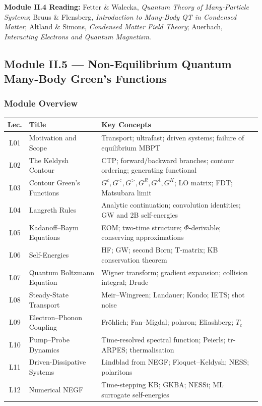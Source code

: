 \documentclass[11pt,a4paper]{article}
\begin{document}
\begin{tcolorbox}[highlightbox]
\textbf{Module II.4 Reading:} Fetter \& Walecka, \textit{Quantum Theory of Many-Particle Systems}; Bruus \& Flensberg, \textit{Introduction to Many-Body QT in Condensed Matter}; Altland \& Simons, \textit{Condensed Matter Field Theory}; Auerbach, \textit{Interacting Electrons and Quantum Magnetism}.
\end{tcolorbox}

\subsection{Module II.5 --- Non-Equilibrium Quantum Many-Body Green's Functions}
\label{sec:mod-II5}

\subsubsection*{Module Overview}
\begin{center}
\begin{tabularx}{\textwidth}{clX}
\toprule
\textbf{Lec.} & \textbf{Title} & \textbf{Key Concepts}\\
\midrule
L01 & Motivation and Scope & Transport; ultrafast; driven systems; failure of equilibrium MBPT\\
L02 & The Keldysh Contour & CTP; forward/backward branches; contour ordering; generating functional\\
L03 & Contour Green's Functions & $G^c,G^<,G^>,G^R,G^A,G^K$; LO matrix; FDT; Matsubara limit\\
L04 & Langreth Rules & Analytic continuation; convolution identities; GW and 2B self-energies\\
L05 & Kadanoff--Baym Equations & EOM; two-time structure; $\Phi$-derivable; conserving approximations\\
L06 & Self-Energies & HF; GW; second Born; T-matrix; KB conservation theorem\\
L07 & Quantum Boltzmann Equation & Wigner transform; gradient expansion; collision integral; Drude\\
L08 & Steady-State Transport & Meir--Wingreen; Landauer; Kondo; IETS; shot noise\\
L09 & Electron--Phonon Coupling & Fr\"ohlich; Fan--Migdal; polaron; Eliashberg; $T_c$\\
L10 & Pump--Probe Dynamics & Time-resolved spectral function; Peierls; tr-ARPES; thermalisation\\
L11 & Driven-Dissipative Systems & Lindblad from NEGF; Floquet--Keldysh; NESS; polaritons\\
L12 & Numerical NEGF & Time-stepping KB; GKBA; NESSi; ML surrogate self-energies\\
\bottomrule
\end{tabularx}
\end{center}
\end{document}

